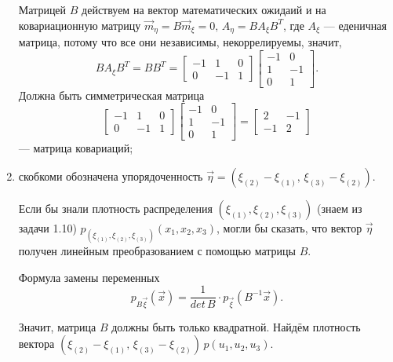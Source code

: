 \begin{enumerate}[label=\alph*)]
  Матрицей $B$ действуем на вектор математических ожидаий и на ковариационную матрицу
  $ \vec{m}_{ \eta } = B \vec{m}_{ \xi } = 0, \, A_{ \eta } = BA_{ \xi } B^T$, где $A_{ \xi }$ ---
  еденичная матрица, потому что все они независимы, некоррелируемы, значит,
  $$BA_{ \xi }B^T =
    BB^T =
    \begin{bmatrix}
      -1 & 1 & 0 \\
      0 & -1 & 1
    \end{bmatrix}
    \begin{bmatrix}
      -1 & 0 \\
      1 & -1 \\
      0 & 1
    \end{bmatrix}.$$
  Должна быть симметрическая матрица
  $$ \begin{bmatrix}
      -1 & 1 & 0 \\
      0 & -1 & 1
    \end{bmatrix}
    \begin{bmatrix}
      -1 & 0 \\
      1 & -1 \\
      0 & 1
    \end{bmatrix} =
    \begin{bmatrix}
      2 & -1 \\
      -1 & 2
    \end{bmatrix}$$
  --- матрица ковариаций;
  \item скобкоми обозначена упорядоченность
  $ \vec{ \eta } =
    \left(
      \xi_{ \left( 2 \right) } - \xi_{ \left( 1 \right) }, \,
      \xi_{ \left( 3 \right) } - \xi_{ \left( 2 \right) }
    \right) $.

  Если бы знали плотность распределения
  $ \left( \xi_{ \left( 1 \right) }, \xi_{ \left( 2 \right) }, \xi_{ \left( 3 \right) } \right) $
  (знаем из задачи 1.10)
  $p_{ \left( \xi_{ \left( 1 \right) }, \xi_{ \left( 2 \right) }, \xi_{ \left( 3 \right) } \right) }
    \left( x_1, x_2, x_3 \right) $,
  могли бы сказать,
  что вектор $ \vec{ \eta }$ получен линейным преобразованием с помощью матрицы $B$.

  Формула замены переменных
  $$p_{B \vec{ \xi }} \left( \vec{x} \right) =
    \frac{1}{det \, B} \cdot p_{ \vec{ \xi }} \left( B^{-1} \vec{x} \right).$$

  Значит, матрица $B$ должны быть только квадратной.
  Найдём плотность вектора
  $ \left(
      \xi_{ \left( 2 \right) } - \xi_{ \left( 1 \right) }, \,
      \xi_{ \left( 3 \right) } - \xi_{ \left( 2 \right) }
    \right) \,
    p \left( u_1, u_2, u_3 \right) $.


\end{enumerate}
